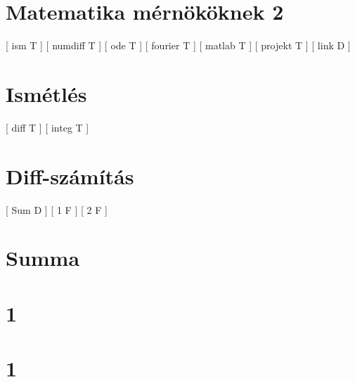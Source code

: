 


\begin{spacing}{1.4}
\pagecolor{BGSZ}

\section*{Matematika mérnököknek 2} \label{DB}
 [ ism T ]
\newline
{}
 [ numdiff T ]
\newline
{}
 [ ode T ]
\newline
{}
 [ fourier T ]
\newline
{}
 [ matlab T ]
\newline
{}
 [ projekt T ]
\newline
{}
 [ link D ]
\newpage
\section*{Ismétlés} \label{DBism}
 [ diff T ]
\newline
{}
 [ integ T ]
\vspace{0.5cm}
\newpage
\section*{Diff-számítás} \label{DBismdiff}
 [ Sum D ]
\newline
{}
 [ 1 F ]
\newline
{}
 [ 2 F ]
\vspace{0.5cm}
\newpage
\section*{Summa} \label{DBismdiffSum}
\Desc{

}
\vspace{0.5cm}
\newpage
\section*{1} \label{DBismdiff1}
\Fa{

}
\vspace{0.5cm}
\newpage
\section*{1} \label{DBismdiff1Mo}
\Mo{

}
\vspace{0.5cm}
\newpage

\end{spacing}
